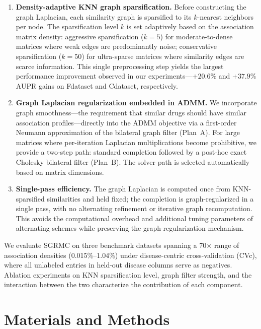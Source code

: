 \documentclass[webpdf,modern,large]{oup-authoring-template}
\begin{document}
\begin{enumerate}
    \item \textbf{Density-adaptive KNN graph sparsification.} Before constructing the graph Laplacian, each similarity graph is sparsified to its $k$-nearest neighbors per node. The sparsification level $k$ is set adaptively based on the association matrix density: aggressive sparsification ($k=5$) for moderate-to-dense matrices where weak edges are predominantly noise; conservative sparsification ($k=50$) for ultra-sparse matrices where similarity edges are scarce information. This single preprocessing step yields the largest performance improvement observed in our experiments---$+20.6\%$ and $+37.9\%$ AUPR gains on Fdataset and Cdataset, respectively.

    \item \textbf{Graph Laplacian regularization embedded in ADMM.} We incorporate graph smoothness---the requirement that similar drugs should have similar association profiles---directly into the ADMM objective via a first-order Neumann approximation of the bilateral graph filter (Plan~A). For large matrices where per-iteration Laplacian multiplications become prohibitive, we provide a two-step path: standard completion followed by a post-hoc exact Cholesky bilateral filter (Plan~B). The solver path is selected automatically based on matrix dimensions.

    \item \textbf{Single-pass efficiency.} The graph Laplacian is computed once from KNN-sparsified similarities and held fixed; the completion is graph-regularized in a single pass, with no alternating refinement or iterative graph recomputation. This avoids the computational overhead and additional tuning parameters of alternating schemes while preserving the graph-regularization mechanism.
\end{enumerate}

We evaluate SGRMC on three benchmark datasets spanning a 70$\times$ range of association densities (0.015\%--1.04\%) under disease-centric cross-validation (CVc), where all unlabeled entries in held-out disease columns serve as negatives. Ablation experiments on KNN sparsification level, graph filter strength, and the interaction between the two characterize the contribution of each component.

\section{Materials and Methods}
\end{document}

